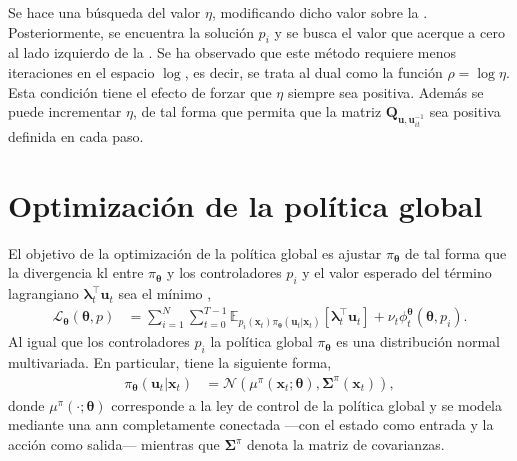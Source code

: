 Se hace una búsqueda del valor $\eta$, modificando dicho valor sobre la . Posteriormente, se encuentra la solución $p_i$ y se busca el valor que acerque a cero al lado izquierdo de la . Se ha observado que este método requiere menos iteraciones en el espacio $\log$, es decir, se trata al dual como la función $\rho = \log \eta$. Esta condición tiene el efecto de forzar que $\eta$ siempre sea positiva. Además se puede incrementar $\eta$, de tal forma que permita que la matriz $\mathbf{Q}_{\mathbf{u}, \mathbf{u}_{it}^{-1}}$ sea positiva definida en cada paso. \cite{2014-mfcgps}


\section{Optimización de la política global}
El objetivo de la optimización de la política global es ajustar $\pi_{\bm\theta}$ de tal forma que la divergencia \acrshort{kl} entre $\pi_{\bm\theta}$ y los controladores $p_i$ y el valor esperado del término lagrangiano $\mathbf{\lambda}_t^{\top}\mathbf{u}_t$ sea el mínimo \cite{Schneider2018}, 
\begin{align}
    \mathcal{L}_{\bm\theta}(\bm\theta, p) &= \sum_{i=1}^{N}\sum_{t=0}^{T-1}\mathbb{E}_{p_i(\mathbf{x}_t)\pi_{\bm\theta}(\mathbf{u}_t|\mathbf{x}_t)}[\bm{\lambda}_t^{\top}\mathbf{u}_t]  + \nu_t \phi_{t}^{\bm\theta}(\bm\theta, p_i).
\end{align}
Al igual que los controladores $p_i$ la política global $\pi_{\bm\theta}$ es una distribución normal multivariada. En particular, tiene la siguiente forma,
\begin{align}
    \pi_{\bm{\theta}}(\mathbf{u}_t|\mathbf{x}_t) &= \mathcal{N}(\mu^{\pi}(\mathbf{x}_t; \bm\theta), \bm\Sigma^{\pi}(\mathbf{x}_t)),  
\end{align}
donde $\mu^{\pi}(\cdot; \bm\theta)$ corresponde a la ley de control de la política global y se modela mediante una \acrshort{ann} completamente conectada —con el estado como entrada y la acción como salida— mientras que $\bm\Sigma^{\pi}$ denota la matriz de covarianzas.

